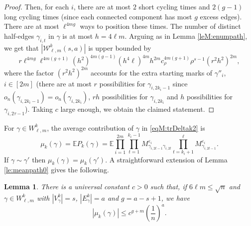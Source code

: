 \documentclass[11pt]{article}
\newtheorem{lemma}{Lemma}
\newcommand{\dE}{\mathbb {E}}
\newcommand{\cE}{E}
\newcommand{\cW}{\mathcal {W}}
\newcommand{\ABS}[1]{{{\left| #1 \right|}}} %
\newcommand{\PAR}[1]{{{\left(#1\right)}}} %
\newcommand{\1}{1\!\!{\sf I}}\newcommand{\IND}{\1}
\newcommand{\veps}{\varepsilon}
\begin{document}
\begin{proof}
Then, for each $i$, there are at most $2$ short cycling times and $2 (g-1)$ long cycling times (since each connected component has most $g$ excess edges). There are at most $ \ell  ^{4m g}$ ways to position these times. The number of distinct half-edges $\gamma_{i,t}$ in $\gamma$ is at most $h = 4 \ell m$.  Arguing as in Lemma \ref{leM:enumpath}, we get that  $| \cW^k_{\ell,m} (s,a) | $ is upper bounded by 
$$
 r \ell ^{4 m g} \ell^{4 m (g+1)}\PAR{h^{2}}^ {4m(g-1)} \PAR{h^4\ell}^{4m} h^{2m}c_\rho^{4 m (g +1)}\rho^{s -1}   ( r^2 h^2  )^{2m},
$$
where the factor $( r^2 h^2)^{2m}$ accounts for the extra starting marks of $\gamma''_i$, $i \in [2m]$ (there are at most $r$ possibilities for $\gamma_{i,2k_i-1}$ since $o_n(\gamma_{i,2k_i-1}) = o_n(\gamma_{i,2k_i})$, $r h$ possibilities for $\gamma_{i,2k_i}$ and $h$ possibilities for $\gamma_{i,2\tau-1}$).  Taking $c$ large enough, we obtain the claimed statement. \end{proof}


For $\gamma \in W^k_{\ell,m}$, the average contribution of $\gamma$ in \eqref{eqM:trDeltak2} is
\begin{equation*}\mu_k(\gamma) = \dE P_k (\gamma) = \dE \prod_{i=1}^{2m}  \prod_{t=1}^{k_i-1}  M^{\veps_i}_{\gamma_{i,2t-1}  \gamma_{i,2t}}   \prod_{t=k_i+1}^{\ell} M^{\veps_i}_{\gamma_{i,2t-1}}.
\end{equation*}
If $\gamma \sim \gamma'$ then $\mu_k (\gamma) = \mu_k (\gamma')$. A straightforward extension of Lemma \ref{le:meanpath0} gives the following. 
\begin{lemma}\label{leM:meanpath0}
There is a universal constant $c > 0$ such that, if $6 \ell m \leq \sqrt{  n}$ and $\gamma \in W^k_{\ell,m} $ with $|V^k_\gamma| = s$, $|\cE^k_\gamma |= a$ and $g = a - s +1$, we have
$$
\ABS{ \mu_k(\gamma)} \leq  c^{g+m}  \PAR{\frac{ 1 }{n} }^a.  
$$
\end{lemma}
\end{document}
